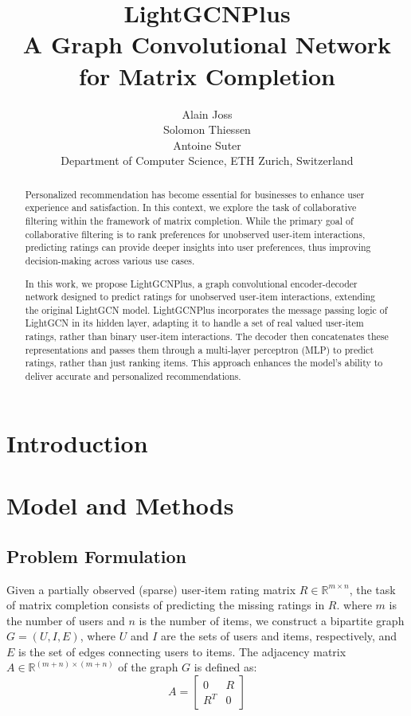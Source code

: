 \documentclass[10pt,conference,compsocconf]{IEEEtran}
\begin{document}
\title{LightGCNPlus \\ A Graph Convolutional Network for Matrix Completion}

\author{
  Alain Joss \\
  Solomon Thiessen \\
  Antoine Suter \\
  Department of Computer Science, ETH Zurich, Switzerland
}

\maketitle

\begin{abstract}
  Personalized recommendation has become essential for businesses to enhance user experience and satisfaction. 
  In this context, we explore the task of collaborative filtering within the framework of matrix completion. 
  While the primary goal of collaborative filtering is to rank preferences for unobserved user-item interactions, 
  predicting ratings can provide deeper insights into user preferences, 
  thus improving decision-making across various use cases.
  
  In this work, we propose LightGCNPlus, a graph convolutional encoder-decoder network designed to predict ratings for unobserved user-item interactions, 
  extending the original LightGCN model. 
  LightGCNPlus incorporates the message passing logic of LightGCN in its hidden layer, adapting it to handle a set of real valued user-item ratings, rather than binary user-item interactions.
  The decoder then concatenates these representations and passes them through a multi-layer perceptron (MLP) to predict ratings, rather than just ranking items. 
  This approach enhances the model's ability to deliver accurate and personalized recommendations.
\end{abstract}

\section{Introduction}

\section{Model and Methods}
\subsection{Problem Formulation}
Given a partially observed (sparse) user-item rating matrix $R \in \mathbb{R}^{m \times n}$, the task of matrix completion consists of predicting the missing ratings in $R$.
where $m$ is the number of users and $n$ is the number of items, we construct a bipartite graph $G = (U, I, E)$, where $U$ and $I$ are the sets of users and items, respectively, and $E$ is the set of edges connecting users to items.
The adjacency matrix $A \in \mathbb{R}^{(m+n) \times (m+n)}$ of the graph $G$ is defined as:
\begin{equation}
    A = \begin{bmatrix}
    0 & R \\
    R^T & 0
    \end{bmatrix}
\end{equation}
\end{document}
